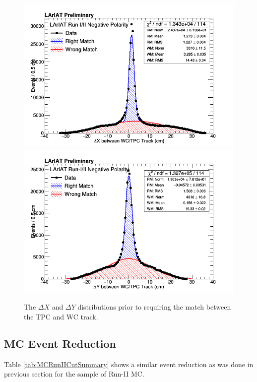 \begin{figure}[h!]
\centering
\includegraphics[scale=0.30]{./images/DeltaX.png}
\includegraphics[scale=0.30]{./images/DeltaY.png}
\caption{The $\Delta X$ and $\Delta Y$ distributions prior to requiring the match between the TPC and WC track.}
\label{fig:DeltaXDeltaY}
\end{figure}

\subsection{MC Event Reduction} \label{sec:MCReduction}
Table \ref{tab:MCRunIICutSummary} shows a similar event reduction as was done in previous section for the sample of Run-II MC.

